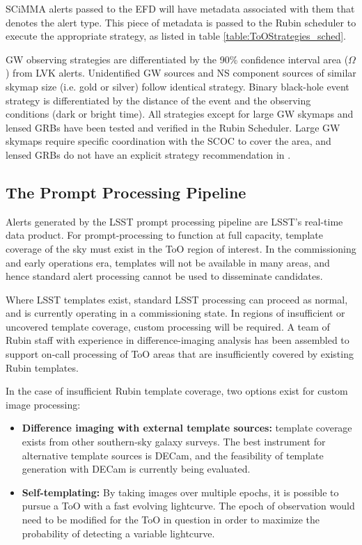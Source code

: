 SCiMMA alerts passed to the EFD will have metadata associated with them that denotes the alert type. This piece of metadata is passed to the Rubin scheduler to execute the appropriate strategy, as listed in table \ref{table:ToOStrategies_sched}.

GW observing strategies are differentiated by the 90\% confidence interval area ($\Omega$) from LVK alerts. Unidentified GW sources and NS component sources of similar skymap size (i.e. gold or silver) follow identical strategy. Binary black-hole event strategy is differentiated by the distance of the event and the observing conditions (dark or bright time). All strategies except for large GW skymaps and lensed GRBs have been tested and verified in the Rubin Scheduler. Large GW skymaps require specific coordination with the SCOC to cover the area, and lensed GRBs do not have an explicit strategy recommendation in \cite{RubinToO2024}.

\subsection{The Prompt Processing Pipeline}\label{subsec:PP}

Alerts generated by the LSST prompt processing pipeline are LSST’s real-time data product. For prompt-processing to function at full capacity, template coverage of the sky must exist in the ToO region of interest. In the commissioning and early operations era, templates will not be available in many areas, and hence standard alert processing cannot be used to disseminate candidates. 

Where LSST templates exist, standard LSST processing can proceed as normal, and is currently operating in a commissioning state. In regions of insufficient or uncovered template coverage, custom processing will be required. A team of Rubin staff with experience in difference-imaging analysis has been assembled to support on-call processing of ToO areas that are insufficiently covered by existing Rubin templates.

In the case of insufficient Rubin template coverage, two options exist for custom image processing:

\begin{itemize}
    \item \textbf{Difference imaging with external template sources:} template coverage exists from other southern-sky galaxy surveys. The best instrument for alternative template sources is DECam, and the feasibility of template generation with DECam is currently being evaluated.
    \item \textbf{Self-templating:} By taking images over multiple epochs, it is possible to pursue a ToO with a fast evolving lightcurve. The epoch of observation would need to be modified for the ToO in question in order to maximize the probability of detecting a variable lightcurve. 
\end{itemize}

